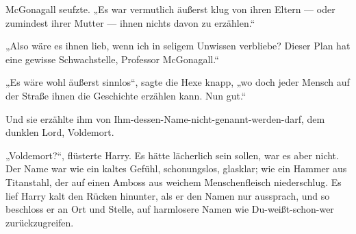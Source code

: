 McGonagall seufzte.
„Es war vermutlich äußerst klug von ihren Eltern — oder zumindest ihrer Mutter — ihnen nichts davon zu erzählen.“

„Also wäre es ihnen lieb, wenn ich in seligem Unwissen verbliebe? Dieser Plan hat eine gewisse Schwachstelle, Professor McGonagall.“

„Es wäre wohl äußerst sinnlos“, sagte die Hexe knapp, „wo doch jeder Mensch auf der Straße ihnen die Geschichte erzählen kann. Nun gut.“

Und sie erzählte ihm von Ihm-dessen-Name-nicht-genannt-werden-darf, dem dunklen Lord, Voldemort.

„Voldemort?“, flüsterte Harry. Es hätte lächerlich sein sollen, war es aber nicht. Der Name war wie ein kaltes Gefühl, schonungslos, glasklar; wie ein Hammer aus Titanstahl, der auf einen Amboss aus weichem Menschenfleisch niederschlug. Es lief Harry kalt den Rücken hinunter, als er den Namen nur aussprach, und so beschloss er an Ort und Stelle, auf harmlosere Namen wie Du-weißt-schon-wer zurückzugreifen.

